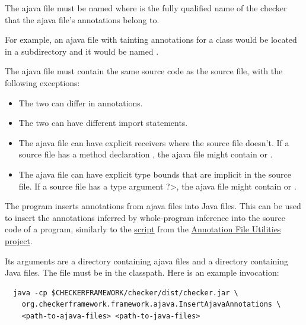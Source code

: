The ajava file must be named
 where
 is the fully qualified name of the checker that
the ajava file's annotations belong to.

For example, an ajava file with
tainting annotations for a class  would
be located in a subdirectory  and it would be
named
.



The
ajava file must contain the same source code as the source file, with the following exceptions:
\begin{itemize}
  \item The two can differ in annotations.
  \item The two can have different import statements.
  \item The ajava file can have explicit receivers where the source file
    doesn't. If a source file has a method declaration , the ajava file might contain  or .
  \item The ajava file can have explicit type bounds that are implicit in the source file.
    If a source file has a type argument \<?>,
    the ajava file might contain  or .
\end{itemize}



The  program inserts annotations
from ajava files into Java files.  This can be used to
insert the annotations inferred by whole-program inference into the source code
of a program, similarly to the
\href{https://checkerframework.org/annotation-file-utilities/#insert-annotations-to-source}{
  script} from the
\href{https://checkerframework.org/annotation-file-utilities/}{Annotation
  File Utilities project}.

Its arguments are a directory containing ajava files and a directory
containing Java files.  The  file must be in the classpath.
Here is an example invocation:
\begin{Verbatim}
  java -cp $CHECKERFRAMEWORK/checker/dist/checker.jar \
    org.checkerframework.framework.ajava.InsertAjavaAnnotations \
    <path-to-ajava-files> <path-to-java-files>
\end{Verbatim}


